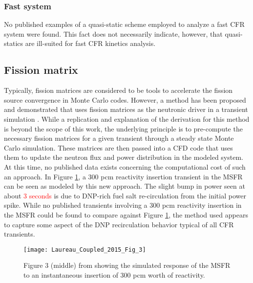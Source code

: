 \documentclass[review]{elsarticle}
\begin{document}
\subsubsection{Fast system} \label{sssec:qs_fast}
No published examples of a quasi-static scheme employed to analyze a fast
CFR system were found. This fact does not necessarily indicate, however, that
quasi-statics are ill-suited for fast CFR kinetics analysis.

\subsection{Fission matrix}
Typically, fission matrices are considered to be tools to accelerate the fission
source convergence in Monte Carlo codes. However,  
a method has been proposed and demonstrated that uses
fission matrices as the neutronic driver in a transient simulation \cite{laureau_coupled_2015}. While a
replication and explanation of the derivation for this method is beyond the
scope of this work, the underlying principle is to pre-compute the necessary
fission matrices for a given transient through a steady state Monte Carlo
simulation. These matrices are then passed into a CFD code that uses them
to update the neutron flux and power distribution in the modeled system. At
this time, no published data exists concerning the computational cost
of such an approach. In Figure \ref{fig:laureau_msfr}, a 300 pcm reactivity
insertion transient in the MSFR can be seen as modeled by this new approach. The
slight bump in power seen at about \textcolor{red}{3 seconds} is due to DNP-rich fuel salt
re-circulation from the initial power spike. While no published transients
involving a 300 pcm reactivity insertion in the MSFR could be found to compare
against Figure \ref{fig:laureau_msfr}, the method used appears to
capture some aspect of the DNP recirculation behavior typical of all CFR
transients.

\begin{figure}[H]
   \centering
   \texttt{[image: Laureau\_Coupled\_2015\_Fig\_3]}
   \caption{Figure 3 (middle) from \cite{laureau_coupled_2015} showing the simulated response of
   the MSFR to an instantaneous insertion of 300 pcm worth of reactivity.} 
   \label{fig:laureau_msfr}
\end{figure}
\end{document}
